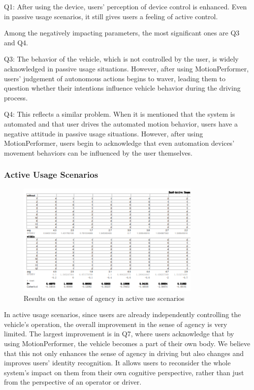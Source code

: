 Q1: After using the device, users' perception of device control is enhanced. Even in passive usage scenarios, it still gives users a feeling of active control.

Among the negatively impacting parameters, the most significant ones are Q3 and Q4.

Q3: The behavior of the vehicle, which is not controlled by the user, is widely acknowledged in passive usage situations. However, after using MotionPerformer, users' judgement of autonomous actions begins to waver, leading them to question whether their intentions influence vehicle behavior during the driving process.

Q4: This reflects a similar problem. When it is mentioned that the system is automated and that user drives the automated motion behavior, users have a negative attitude in passive usage situations. However, after using MotionPerformer, users begin to acknowledge that even automation devices' movement behaviors can be influenced by the user themselves.

\subsubsection{Active Usage Scenarios}
\begin{figure}[h]
\centering
\includegraphics[width=0.8\textwidth]{A_thesis/figures/014-02.png}
\caption{Results on the sense of agency in active use scenarios}
\end{figure}

In active usage scenarios, since users are already independently controlling the vehicle's operation, the overall improvement in the sense of agency is very limited. The largest improvement is in Q7, where users acknowledge that by using MotionPerformer, the vehicle becomes a part of their own body. We believe that this not only enhances the sense of agency in driving but also changes and improves users' identity recognition. It allows users to reconsider the whole system's impact on them from their own cognitive perspective, rather than just from the perspective of an operator or driver.

